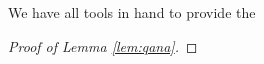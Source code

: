 \documentclass[
	fontsize=11pt, 
	twoside=false, 
	abstract=true, 
	a4paper,
]{scrartcl}
\newcommand{\RR}{\mathbb{R}}
\newcommand{\dd}{\mathrm{d}}
\newcommand{\del}{\partial}
\newcommand{\td}[1]{\tilde{#1}}
\begin{document}
We have all tools in hand to provide the
\begin{proof}[Proof of Lemma \ref{lem:qana}]%
%


\end{proof}
\end{document}
